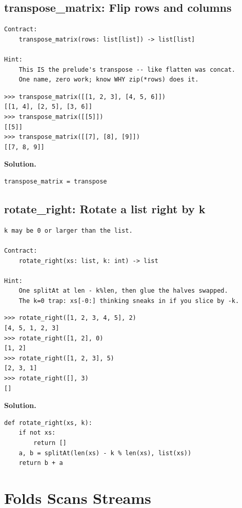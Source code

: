 \documentclass[10pt,letterpaper]{book}
\begin{document}
\section{transpose\_matrix: Flip rows and columns}
\begin{lstlisting}[style=ex]
Contract:
    transpose_matrix(rows: list[list]) -> list[list]

Hint:
    This IS the prelude's transpose -- like flatten was concat.
    One name, zero work; know WHY zip(*rows) does it.
\end{lstlisting}
\begin{lstlisting}[style=ex]
>>> transpose_matrix([[1, 2, 3], [4, 5, 6]])
[[1, 4], [2, 5], [3, 6]]
>>> transpose_matrix([[5]])
[[5]]
>>> transpose_matrix([[7], [8], [9]])
[[7, 8, 9]]
\end{lstlisting}
\noindent\textbf{Solution.}
\begin{lstlisting}[style=code]
transpose_matrix = transpose
\end{lstlisting}

\section{rotate\_right: Rotate a list right by k}
\begin{lstlisting}[style=ex]
k may be 0 or larger than the list.

Contract:
    rotate_right(xs: list, k: int) -> list

Hint:
    One splitAt at len - k%len, then glue the halves swapped.
    The k=0 trap: xs[-0:] thinking sneaks in if you slice by -k.
\end{lstlisting}
\begin{lstlisting}[style=ex]
>>> rotate_right([1, 2, 3, 4, 5], 2)
[4, 5, 1, 2, 3]
>>> rotate_right([1, 2], 0)
[1, 2]
>>> rotate_right([1, 2, 3], 5)
[2, 3, 1]
>>> rotate_right([], 3)
[]
\end{lstlisting}
\noindent\textbf{Solution.}
\begin{lstlisting}[style=code]
def rotate_right(xs, k):
    if not xs:
        return []
    a, b = splitAt(len(xs) - k % len(xs), list(xs))
    return b + a
\end{lstlisting}
\chapter{Folds Scans Streams}
\end{document}
